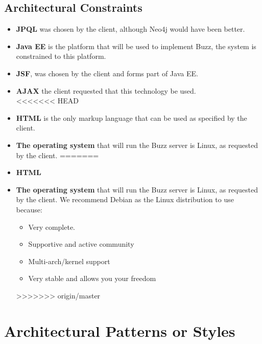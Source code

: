 \documentclass[a4paper,12pt,titlepage]{article}
\begin{document}
\subsection{Architectural Constraints}
	\begin{itemize}
		\item\textbf{JPQL} was chosen by the client, although Neo4j would have been better. \\ 
		\item\textbf{Java EE} is the platform that will be used to implement Buzz, the system is constrained to this platform. \\ 
		\item\textbf{JSF}, was chosen by the client and forms part of Java EE. \\ 
		\item\textbf{AJAX} the client requested that this technology be used.  \\ 
<<<<<<< HEAD
		\item\textbf{HTML} is the only markup language that can be used as specified by the client.\\
		\item\textbf{The operating system} that will run the Buzz server is Linux, as requested by the client.
=======
		\item\textbf{HTML} \\
		\item\textbf{The operating system} that will run the Buzz server is Linux, as requested by the client. We recommend Debian as the Linux distribution to use because:  
		\begin{itemize}
			\item Very complete.
			\item Supportive and active community 
			\item Multi-arch/kernel support
			\item Very stable and allows you your freedom
		\end{itemize}
>>>>>>> origin/master
		\end{itemize}
\newpage
\section{Architectural Patterns or Styles}%
\newpage
\end{document}
